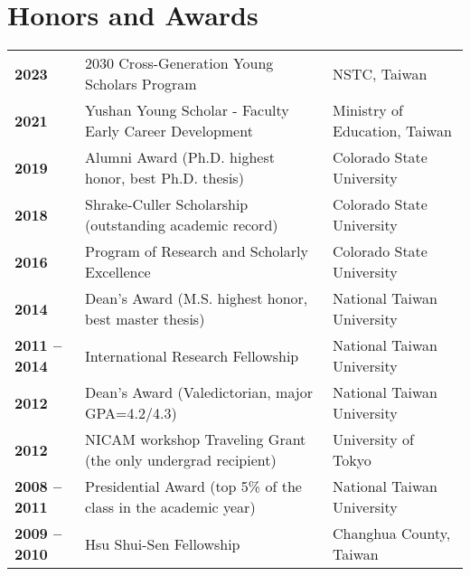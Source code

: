 \documentclass{article}
\begin{document}
\section{\color{airforceblue}Honors and Awards}
\begin{tabular}{>{\bfseries}p{2.5cm}p{10.5cm}p{\linewidth-2.5cm\relax}}
	2023   & 2030 Cross-Generation Young Scholars Program & NSTC, Taiwan
     \\ 
     2021   & Yushan Young Scholar - Faculty Early Career Development & Ministry of Education, Taiwan  
     \\ 
     2019   & Alumni Award (Ph.D. highest honor, best Ph.D. thesis) & Colorado State University 
     \\
     2018   & Shrake-Culler Scholarship (outstanding academic record) & Colorado State University 
     \\  
	 2016   & Program of Research and Scholarly Excellence & Colorado State University 
	 \\
     2014  & Dean’s Award (M.S. highest honor, best master thesis) & National Taiwan University 
     \\
     2011 -- 2014 & International Research Fellowship & National Taiwan University 
     \\
     2012        & Dean’s Award (Valedictorian, major GPA=4.2/4.3) & National Taiwan University  
     \\
     2012        & NICAM workshop Traveling Grant (the only undergrad recipient)  & University of Tokyo
     \\  
     2008 -- 2011 & Presidential Award (top 5\% of the class in the academic year) & National Taiwan University 
     \\

     2009 -- 2010 & Hsu Shui-Sen Fellowship   & Changhua County, Taiwan 
     
\end{tabular}
\end{document}
